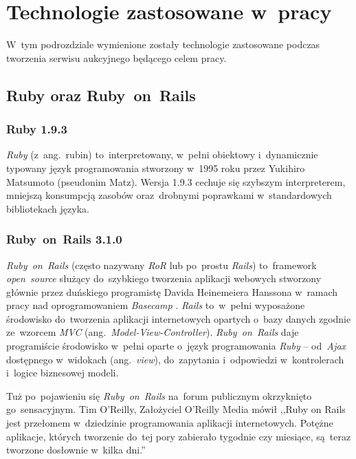 \section{Technologie zastosowane w~pracy}

W~tym podrozdziale wymienione zostały technologie zastosowane podczas tworzenia serwisu aukcyjnego będącego celem pracy.

\subsection{Ruby oraz Ruby~on~Rails} \label{technologie.baza}

\subsubsection{Ruby 1.9.3} \label{technologie.ruby}

\textit{Ruby} (z~ang.~rubin) to~interpretowany, w~pełni obiektowy i~dynamicznie typowany język programowania stworzony w~1995 roku przez Yukihiro Matsumoto (pseudonim Matz). Wersja 1.9.3 cechuje się szybszym interpreterem, mniejszą konsumpcją zasobów oraz~drobnymi poprawkami w~standardowych bibliotekach języka.

\subsubsection{Ruby~on~Rails 3.1.0} \label{technologie.ror}

\textit{Ruby~on~Rails} \cite{ror} (często nazywany \textit{RoR} lub po~prostu \textit{Rails}) to~framework \textit{open~source} służący do~szybkiego tworzenia aplikacji webowych stworzony głównie przez duńskiego programistę Davida Heinemeiera Hanssona w~ramach pracy nad oprogramowaniem \textit{Basecamp} \cite{basecamp}. \textit{Rails} to~w~pełni wyposażone środowisko do~tworzenia aplikacji internetowych opartych o~bazy danych zgodnie ze~wzorcem \textit{MVC} (ang.~\textit{Model-View-Controller}). \textit{Ruby~on~Rails} daje programiście środowisko w~pełni oparte o~język programowania \textit{Ruby} -- od~\textit{Ajax} dostępnego w~widokach (ang.~\textit{view}), do~zapytania i~odpowiedzi w~kontrolerach i~logice biznesowej modeli.


Tuż po~pojawieniu się \textit{Ruby~on~Rails} na~forum publicznym okrzyknięto go~sensacyjnym. Tim O'Reilly, Założyciel O'Reilly Media mówił \cite{cytaty} ,,Ruby on Rails jest przełomem w~dziedzinie programowania aplikacji internetowych. Potężne aplikacje, których tworzenie do~tej pory zabierało tygodnie czy miesiące, są~teraz tworzone dosłownie w~kilka dni.''


